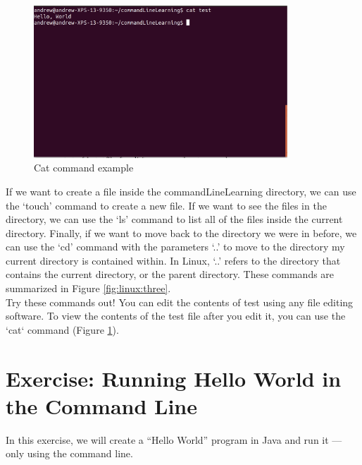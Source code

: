 \begin{figure}[ht]
	\centering
	\includegraphics[width=0.85\textwidth]{images/commandLineFour.png}
	\caption{Cat command example}
	\label{fig:linux:four}
\end{figure}

If we want to create a file inside the commandLineLearning directory, we can use the ‘touch’ command to create a new file. If we want to see the files in the directory, we can use the ‘ls’ command to list all of the files inside the current directory. Finally, if we want to move back to the directory we were in before, we can use the ‘cd’ command with the parameters ‘..’ to move to the directory my current directory is contained within. In Linux, ‘..’ refers to the directory that contains the current directory, or the parent directory. These commands are summarized in Figure \ref{fig:linux:three}. \\

Try these commands out! You can edit the contents of test using any file editing software. To view the contents of the test file after you edit it, you can use the `cat` command (Figure \ref{fig:linux:four}). \\

\section{Exercise: Running Hello World in the Command Line}

In this exercise, we will create a ``Hello World'' program in Java and run it --- only using the command line.


